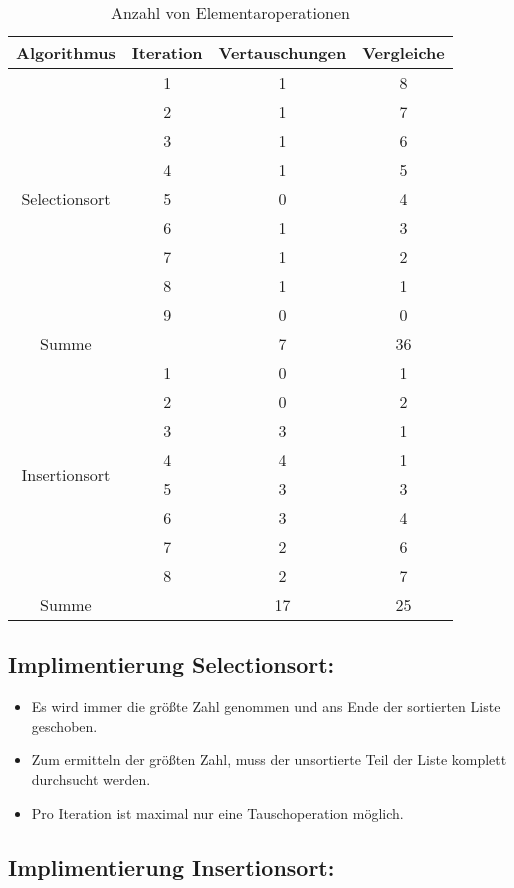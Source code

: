 \documentclass[a4paper]{article}
\begin{document}
\begin{table}[h!]
	\centering
	\begin{tabular}{|c|c|c|c|}
		\hline
		Algorithmus & Iteration & Vertauschungen & Vergleiche \\
		\hline
		\multirow{9}{*}{Selectionsort}
		 & 1 & 1 & 8 \\
		 & 2 & 1 & 7 \\
		 & 3 & 1 & 6 \\
		 & 4 & 1 & 5 \\
		 & 5 & 0 & 4 \\
		 & 6 & 1 & 3 \\
		 & 7 & 1 & 2 \\
		 & 8 & 1 & 1 \\
		 & 9 & 0 & 0 \\
		\hline
		Summe &   & 7 & 36 \\
		\hline
		\hline
		\multirow{8}{*}{Insertionsort} 
		 & 1 & 0 & 1 \\
		 & 2 & 0 & 2 \\
		 & 3 & 3 & 1 \\
		 & 4 & 4 & 1 \\
		 & 5 & 3 & 3 \\
		 & 6 & 3 & 4 \\
		 & 7 & 2 & 6 \\
		 & 8 & 2 & 7 \\
		\hline
		Summe & & 17 & 25 \\
		\hline
	\end{tabular}
	\caption{Anzahl von Elementaroperationen}
	\label{tab:num_of_operations}
\end{table}

\subsection*{Implimentierung Selectionsort:}

\begin{itemize}
	\item Es wird immer die größte Zahl genommen und ans Ende der
		sortierten Liste geschoben.
	\item Zum ermitteln der größten Zahl, muss der unsortierte Teil der
		Liste komplett durchsucht werden.
	\item Pro Iteration ist maximal nur eine Tauschoperation möglich.
\end{itemize}

\subsection*{Implimentierung Insertionsort:}
\end{document}
